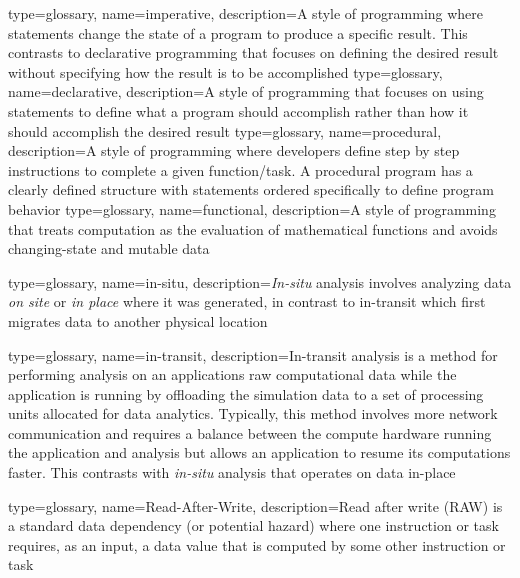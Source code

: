 {
  type=glossary,
  name={imperative},
  description={A style of programming where statements change the state of a program to produce a specific result. This contrasts to declarative programming that focuses on defining the desired result without specifying how the result is to be accomplished}
}
{
  type=glossary,
  name={declarative},
  description={A style of programming that focuses on using statements to define what a program should accomplish rather than how it should accomplish the desired result}
}
{
  type=glossary,
  name={procedural},
  description={A style of programming where developers define step by step instructions to complete a given function/task. A procedural program has a clearly defined structure with statements ordered specifically to define program behavior}
}
{
  type=glossary,
  name={functional},
  description={A style of programming that treats computation as the
    evaluation of mathematical functions and avoids changing-state and mutable
      data}
}


{
  type=glossary,
  name={in-situ},
  description={\textit{In-situ} analysis involves analyzing data \emph{on site} or \emph{in place} where it was generated, in contrast to \gls{in-transit} which first migrates data to another physical location}
}

{
  type=glossary,
  name={in-transit},
  description={In-transit analysis is a method for performing analysis on an applications raw computational data while the application is running by offloading the simulation data to a set of processing units allocated for data analytics. Typically, this method involves more network communication and requires a balance between the compute hardware running the application and analysis but allows an application to resume its computations faster. This contrasts with \textit{\gls{in-situ}} analysis that operates on data in-place}
}

{
  type=glossary,
  name={Read-After-Write},
  description={Read after write (\gls{RAW}) is a standard data dependency (or potential hazard) where one instruction or task requires, as an input, a data value that is computed by some other instruction or task}
}

